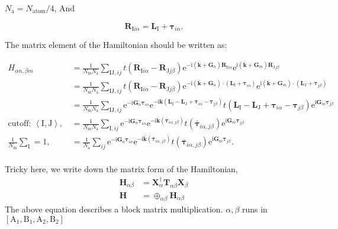 \documentclass[%
 amsmath,amssymb,
rmp,
]{revtex4-1}
\def \bkbar {\bar{\mathbf{k}}}
\def \bG    {\mathbf{G}}
\def \e     {\mathrm{e}}
\def \I     {\mathrm{I}}
\def \J     {\mathrm{J}}
\def \i     {\mathrm{i}}
\def \bR    {\mathbf{R}}
\def \bL    {\mathbf{L}}
\def \btau  {\bm{\tau}}
\def \bH    {\mathbf{H}}
\begin{document}
$N_{\mathrm{a}} = N_{\mathrm{atom}}/4$, And

\begin{equation}
\bR_{\I i \alpha} = \bL_{\I} + \btau_{i \alpha}.
\end{equation}

The matrix element of the Hamiltonian should be written as:

\begin{equation}
\begin{aligned}
H_{\alpha n, \beta m} &= \frac{1}{N_\mathrm{m} N_\mathrm{a}} \sum_{\I \J,ij} t(\bR_{\I i \alpha}-\bR_{\J j \beta})
\e^{-\i(\bkbar+\bG_n)\bR_{\I i \alpha}} \e^{\i(\bkbar+\bG_m)\bR_{\J j \beta}} \\
&= \frac{1}{N_\mathrm{m} N_\mathrm{a}} \sum_{\I \J,ij} t(\bR_{\I i \alpha}-\bR_{\J j \beta})
\e^{-\i(\bkbar+\bG_n)\cdot(\bL_{\I} +\btau_{i\alpha})} \e^{\i(\bkbar+\bG_m)\cdot(\bL_{\J} +\btau_{j\beta})} \\
&=\frac{1}{N_\mathrm{m} N_\mathrm{a}} \sum_{\I \J,ij} \e^{-\i \bG_n \btau_{i\alpha}} \e^{-\i \bkbar (\bL_\I -\bL_\J+\btau_{i\alpha}-\btau_{j\beta})} 
t(\bL_\I -\bL_\J+\btau_{i\alpha}-\btau_{j\beta}) \e^{\i \bG_m \btau_{j\beta}}\\
\text{cutoff: $\left<\I, \J\right>$,}\,\,&= \frac{1}{N_\mathrm{m} N_\mathrm{a}} \sum_{\I ,ij} \e^{-\i \bG_n \btau_{i\alpha}} \e^{-\i \bkbar (\bar{\btau}_{i\alpha, j\beta})} 
t(\bar{\btau}_{i\alpha, j\beta}) \e^{\i \bG_m \btau_{j\beta}} \\
\text{$\frac{1}{N_{\mathrm{m}}}\sum_{\I} =1$,}\,\,&=\frac{1}{N_\mathrm{a}} \sum_{ij} \e^{-\i \bG_n \btau_{i\alpha}} \e^{-\i \bkbar (\bar{\btau}_{i\alpha, j\beta})} 
t(\bar{\btau}_{i\alpha, j\beta}) \e^{\i \bG_m \btau_{j\beta}}. \\
\end{aligned}
\end{equation}

Tricky here, we write down the matrix form of the Hamiltonian,
\begin{equation}
\begin{aligned}
\bH_{\alpha\beta} &= \mathbf{X}^\dagger_{\alpha} \mathbf{T}_{\alpha\beta} \mathbf{X}_{\beta} \\
\bH &= \oplus_{\alpha \beta} \bH_{\alpha\beta}
\end{aligned}
\end{equation}
The above equation describes a block matrix multiplication. $\alpha,\beta$ runs in $[\mathrm{A}_1,\mathrm{B}_1, \mathrm{A}_2, \mathrm{B}_2]$
\end{document}
